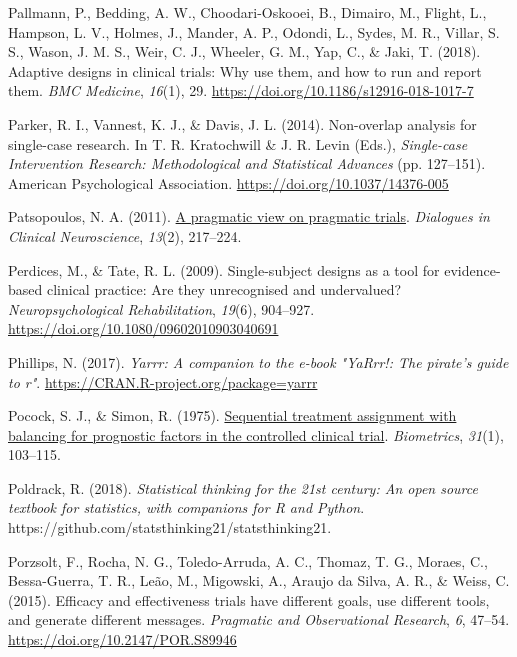 \documentclass{krantz}
\newlength{\cslhangindent}
\newlength{\cslentryspacingunit} %
\newenvironment{CSLReferences}[2] %
{%
\setlength{\parindent}{0pt}
\ifodd #1
\let\oldpar\par
\def\par{\hangindent=\cslhangindent\oldpar}
\fi
\setlength{\parskip}{#2\cslentryspacingunit}
}%
{}
\begin{document}
\begin{CSLReferences}{1}{0}
\leavevmode{}%
Pallmann, P., Bedding, A. W., Choodari-Oskooei, B., Dimairo, M., Flight, L., Hampson, L. V., Holmes, J., Mander, A. P., Odondi, L., Sydes, M. R., Villar, S. S., Wason, J. M. S., Weir, C. J., Wheeler, G. M., Yap, C., \& Jaki, T. (2018). Adaptive designs in clinical trials: Why use them, and how to run and report them. \emph{BMC Medicine}, \emph{16}(1), 29. \url{https://doi.org/10.1186/s12916-018-1017-7}

\leavevmode{}%
Parker, R. I., Vannest, K. J., \& Davis, J. L. (2014). Non-overlap analysis for single-case research. In T. R. Kratochwill \& J. R. Levin (Eds.), \emph{Single-case {Intervention} {Research}: {Methodological} and {Statistical} {Advances}} (pp. 127--151). {American Psychological Association}. \url{https://doi.org/10.1037/14376-005}

\leavevmode{}%
Patsopoulos, N. A. (2011). \href{https://www.ncbi.nlm.nih.gov/pmc/articles/PMC3181997}{A pragmatic view on pragmatic trials}. \emph{Dialogues in Clinical Neuroscience}, \emph{13}(2), 217--224.

\leavevmode{}%
Perdices, M., \& Tate, R. L. (2009). Single-subject designs as a tool for evidence-based clinical practice: {Are} they unrecognised and undervalued? \emph{Neuropsychological Rehabilitation}, \emph{19}(6), 904--927. \url{https://doi.org/10.1080/09602010903040691}

\leavevmode{}%
Phillips, N. (2017). \emph{Yarrr: A companion to the e-book "YaRrr!: The pirate's guide to r"}. \url{https://CRAN.R-project.org/package=yarrr}

\leavevmode{}%
Pocock, S. J., \& Simon, R. (1975). \href{https://www.ncbi.nlm.nih.gov/pubmed/1100130}{Sequential treatment assignment with balancing for prognostic factors in the controlled clinical trial}. \emph{Biometrics}, \emph{31}(1), 103--115.

\leavevmode{}%
Poldrack, R. (2018). \emph{Statistical thinking for the 21st century: {An} open source textbook for statistics, with companions for {R} and {Python}}. https://github.com/statsthinking21/statsthinking21.

\leavevmode{}%
Porzsolt, F., Rocha, N. G., Toledo-Arruda, A. C., Thomaz, T. G., Moraes, C., Bessa-Guerra, T. R., Leão, M., Migowski, A., Araujo da Silva, A. R., \& Weiss, C. (2015). Efficacy and effectiveness trials have different goals, use different tools, and generate different messages. \emph{Pragmatic and Observational Research}, \emph{6}, 47--54. \url{https://doi.org/10.2147/POR.S89946}


\end{CSLReferences}
\end{document}
